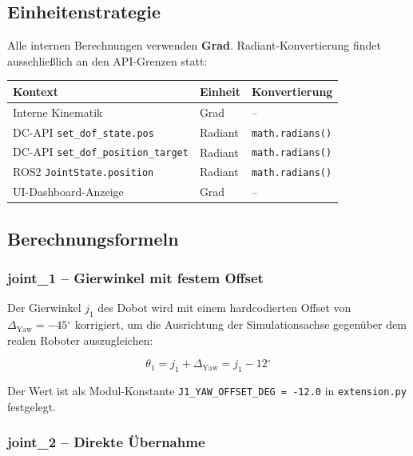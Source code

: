 \documentclass[11pt,a4paper]{article}
\begin{document}
\subsection{Einheitenstrategie}

Alle internen Berechnungen verwenden \textbf{Grad}.
Radiant-Konvertierung findet ausschließlich an den API-Grenzen statt:

\begin{center}
\begin{tabular}{lll}
  \toprule
  Kontext & Einheit & Konvertierung \\
  \midrule
  Interne Kinematik & Grad & -- \\
  DC-API \texttt{set\_dof\_state.pos} & Radiant & \texttt{math.radians()} \\
  DC-API \texttt{set\_dof\_position\_target} & Radiant & \texttt{math.radians()} \\
  ROS2 \texttt{JointState.position} & Radiant & \texttt{math.radians()} \\
  UI-Dashboard-Anzeige & Grad & -- \\
  \bottomrule
\end{tabular}
\end{center}

\subsection{Berechnungsformeln}
\label{sec:formeln}

\subsubsection{joint\_1 -- Gierwinkel mit festem Offset}

Der Gierwinkel $j_1$ des Dobot wird mit einem hardcodierten Offset von
$\Delta_\text{Yaw} = -45{{}^\circ}$ korrigiert, um die Ausrichtung der
Simulationsachse gegenüber dem realen Roboter auszugleichen:

\begin{equation}
  \theta_1 = j_1 + \Delta_\text{Yaw} = j_1 - 12{{}^\circ}
  \label{eq:j1}
\end{equation}

Der Wert ist als Modul-Konstante \texttt{J1\_YAW\_OFFSET\_DEG = -12.0}
in \texttt{extension.py} festgelegt.

\subsubsection{joint\_2 -- Direkte Übernahme}
\end{document}
